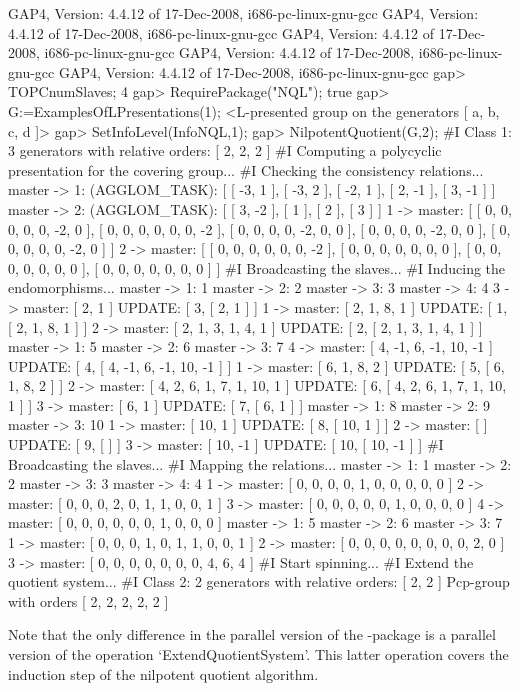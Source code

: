 \beginexample
GAP4, Version: 4.4.12 of 17-Dec-2008, i686-pc-linux-gnu-gcc
GAP4, Version: 4.4.12 of 17-Dec-2008, i686-pc-linux-gnu-gcc
GAP4, Version: 4.4.12 of 17-Dec-2008, i686-pc-linux-gnu-gcc
GAP4, Version: 4.4.12 of 17-Dec-2008, i686-pc-linux-gnu-gcc
GAP4, Version: 4.4.12 of 17-Dec-2008, i686-pc-linux-gnu-gcc
gap> TOPCnumSlaves;
4
gap> RequirePackage("NQL");
true
gap> G:=ExamplesOfLPresentations(1);
<L-presented group on the generators [ a, b, c, d ]>
gap> SetInfoLevel(InfoNQL,1);
gap> NilpotentQuotient(G,2);
#I  Class 1: 3 generators with relative orders: [ 2, 2, 2 ]
#I  Computing a polycyclic presentation for the covering group...
#I  Checking the consistency relations...
master -> 1: (AGGLOM_TASK): [ [ -3, 1 ], [ -3, 2 ], [ -2, 1 ], [ 2, -1 ],
  [ 3, -1 ] ]
master -> 2: (AGGLOM_TASK): [ [ 3, -2 ], [ 1 ], [ 2 ], [ 3 ] ]
1 -> master: [ [ 0, 0, 0, 0, 0, -2, 0 ], [ 0, 0, 0, 0, 0, 0, -2 ],
  [ 0, 0, 0, 0, -2, 0, 0 ], [ 0, 0, 0, 0, -2, 0, 0 ],
  [ 0, 0, 0, 0, 0, -2, 0 ] ]
2 -> master: [ [ 0, 0, 0, 0, 0, 0, -2 ], [ 0, 0, 0, 0, 0, 0, 0 ],
  [ 0, 0, 0, 0, 0, 0, 0 ], [ 0, 0, 0, 0, 0, 0, 0 ] ]
#I  Broadcasting the slaves...
#I  Inducing the endomorphisms...
master -> 1:  1
master -> 2:  2
master -> 3:  3
master -> 4:  4
3 -> master: [ 2, 1 ]
UPDATE: [ 3, [ 2, 1 ] ]
1 -> master: [ 2, 1, 8, 1 ]
UPDATE: [ 1, [ 2, 1, 8, 1 ] ]
2 -> master: [ 2, 1, 3, 1, 4, 1 ]
UPDATE: [ 2, [ 2, 1, 3, 1, 4, 1 ] ]
master -> 1:  5
master -> 2:  6
master -> 3:  7
4 -> master: [ 4, -1, 6, -1, 10, -1 ]
UPDATE: [ 4, [ 4, -1, 6, -1, 10, -1 ] ]
1 -> master: [ 6, 1, 8, 2 ]
UPDATE: [ 5, [ 6, 1, 8, 2 ] ]
2 -> master: [ 4, 2, 6, 1, 7, 1, 10, 1 ]
UPDATE: [ 6, [ 4, 2, 6, 1, 7, 1, 10, 1 ] ]
3 -> master: [ 6, 1 ]
UPDATE: [ 7, [ 6, 1 ] ]
master -> 1:  8
master -> 2:  9
master -> 3:  10
1 -> master: [ 10, 1 ]
UPDATE: [ 8, [ 10, 1 ] ]
2 -> master: [  ]
UPDATE: [ 9, [  ] ]
3 -> master: [ 10, -1 ]
UPDATE: [ 10, [ 10, -1 ] ]
#I  Broadcasting the slaves...
#I  Mapping the relations...
master -> 1:  1
master -> 2:  2
master -> 3:  3
master -> 4:  4
1 -> master: [ 0, 0, 0, 0, 1, 0, 0, 0, 0, 0 ]
2 -> master: [ 0, 0, 0, 2, 0, 1, 1, 0, 0, 1 ]
3 -> master: [ 0, 0, 0, 0, 0, 1, 0, 0, 0, 0 ]
4 -> master: [ 0, 0, 0, 0, 0, 0, 1, 0, 0, 0 ]
master -> 1:  5
master -> 2:  6
master -> 3:  7
1 -> master: [ 0, 0, 0, 1, 0, 1, 1, 0, 0, 1 ]
2 -> master: [ 0, 0, 0, 0, 0, 0, 0, 0, 2, 0 ]
3 -> master: [ 0, 0, 0, 0, 0, 0, 0, 4, 6, 4 ]
#I  Start spinning...
#I  Extend the quotient system...
#I  Class 2: 2 generators with relative orders: [ 2, 2 ]
Pcp-group with orders [ 2, 2, 2, 2, 2 ]
\endexample

Note that the only difference in the parallel version of the \NQL-package
is a parallel version of the operation `ExtendQuotientSystem'. This latter
operation covers the induction step of the nilpotent quotient algorithm.


